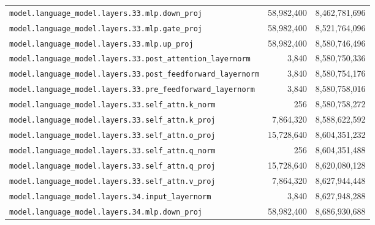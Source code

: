 \documentclass[10pt,a4paper]{article}
\theoremstyle{definition}
\begin{document}
\begin{appendices}
\begin{longtable}{p{9.5cm}rr}
\texttt{model.\allowbreak{}language\_model.\allowbreak{}layers.\allowbreak{}33.\allowbreak{}mlp.\allowbreak{}down\_proj} & 58,982,400 & 8,462,781,696 \\
\texttt{model.\allowbreak{}language\_model.\allowbreak{}layers.\allowbreak{}33.\allowbreak{}mlp.\allowbreak{}gate\_proj} & 58,982,400 & 8,521,764,096 \\
\texttt{model.\allowbreak{}language\_model.\allowbreak{}layers.\allowbreak{}33.\allowbreak{}mlp.\allowbreak{}up\_proj} & 58,982,400 & 8,580,746,496 \\
\texttt{model.\allowbreak{}language\_model.\allowbreak{}layers.\allowbreak{}33.\allowbreak{}post\_attention\_layernorm} & 3,840 & 8,580,750,336 \\
\texttt{model.\allowbreak{}language\_model.\allowbreak{}layers.\allowbreak{}33.\allowbreak{}post\_feedforward\_layernorm} & 3,840 & 8,580,754,176 \\
\texttt{model.\allowbreak{}language\_model.\allowbreak{}layers.\allowbreak{}33.\allowbreak{}pre\_feedforward\_layernorm} & 3,840 & 8,580,758,016 \\
\texttt{model.\allowbreak{}language\_model.\allowbreak{}layers.\allowbreak{}33.\allowbreak{}self\_attn.\allowbreak{}k\_norm} & 256 & 8,580,758,272 \\
\texttt{model.\allowbreak{}language\_model.\allowbreak{}layers.\allowbreak{}33.\allowbreak{}self\_attn.\allowbreak{}k\_proj} & 7,864,320 & 8,588,622,592 \\
\texttt{model.\allowbreak{}language\_model.\allowbreak{}layers.\allowbreak{}33.\allowbreak{}self\_attn.\allowbreak{}o\_proj} & 15,728,640 & 8,604,351,232 \\
\texttt{model.\allowbreak{}language\_model.\allowbreak{}layers.\allowbreak{}33.\allowbreak{}self\_attn.\allowbreak{}q\_norm} & 256 & 8,604,351,488 \\
\texttt{model.\allowbreak{}language\_model.\allowbreak{}layers.\allowbreak{}33.\allowbreak{}self\_attn.\allowbreak{}q\_proj} & 15,728,640 & 8,620,080,128 \\
\texttt{model.\allowbreak{}language\_model.\allowbreak{}layers.\allowbreak{}33.\allowbreak{}self\_attn.\allowbreak{}v\_proj} & 7,864,320 & 8,627,944,448 \\
\texttt{model.\allowbreak{}language\_model.\allowbreak{}layers.\allowbreak{}34.\allowbreak{}input\_layernorm} & 3,840 & 8,627,948,288 \\
\texttt{model.\allowbreak{}language\_model.\allowbreak{}layers.\allowbreak{}34.\allowbreak{}mlp.\allowbreak{}down\_proj} & 58,982,400 & 8,686,930,688 \\

\end{longtable}
\end{appendices}
\end{document}
